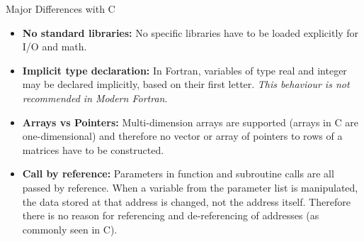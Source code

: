 \documentclass[c,mathserif,compress,xcolor=svgnames]{beamer}
\begin{document}
\begin{frame}{Major Differences with C}
  \begin{itemize}
    \item \textbf{No standard libraries:} No specific libraries have to be loaded explicitly for I/O and math.
    \item \textbf{Implicit type declaration:} In Fortran, variables of type real and integer may be declared implicitly, based on their first letter. {\em This behaviour is not recommended in Modern Fortran}.
    \item \textbf{Arrays vs Pointers:} Multi-dimension arrays are supported (arrays in C are one-dimensional) and therefore no vector or array of pointers to rows of a matrices have to be constructed.
    \item \textbf{Call by reference:} Parameters in function and subroutine calls are all passed by reference. When a variable from the parameter list is manipulated, the data stored at that address is changed, not the address itself. Therefore there is no reason for referencing and de-referencing of addresses (as commonly seen in C). 
  \end{itemize}
\end{frame}
\end{document}
